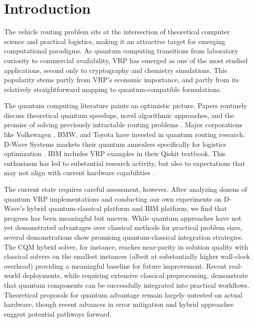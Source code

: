 \documentclass[preprint,3p,12pt,authoryear]{elsarticle}
\begin{document}
\linenumbers

\section{Introduction}

The vehicle routing problem sits at the intersection of theoretical computer science and practical logistics, making it an attractive target for emerging computational paradigms. As quantum computing transitions from laboratory curiosity to commercial availability, VRP has emerged as one of the most studied applications, second only to cryptography and chemistry simulations. This popularity stems partly from VRP's economic importance, and partly from its relatively straightforward mapping to quantum-compatible formulations.

The quantum computing literature paints an optimistic picture. Papers routinely discuss theoretical quantum speedups, novel algorithmic approaches, and the promise of solving previously intractable routing problems \citep{cerezo2021variational, bharti2022noisy}. Major corporations like Volkswagen \citep{neukart2017traffic}, BMW, and Toyota have invested in quantum routing research. D-Wave Systems markets their quantum annealers specifically for logistics optimization \citep{yarkoni2022quantum}. IBM includes VRP examples in their Qiskit textbook. This enthusiasm has led to substantial research activity, but also to expectations that may not align with current hardware capabilities \citep{preskill2018quantum}.


The current state requires careful assessment, however. After analyzing dozens of quantum VRP implementations and conducting our own experiments on D-Wave's hybrid quantum-classical platform and IBM platform, we find that progress has been meaningful but uneven. While quantum approaches have not yet demonstrated advantages over classical methods for practical problem sizes, several demonstrations show promising quantum-classical integration strategies. The CQM hybrid solver, for instance, reaches near-parity in solution quality with classical solvers on the smallest instances (albeit at substantially higher wall-clock overhead) providing a meaningful baseline for future improvement. Recent real-world deployments, while requiring extensive classical preprocessing, demonstrate that quantum components can be successfully integrated into practical workflows. Theoretical proposals for quantum advantage remain largely untested on actual hardware, though recent advances in error mitigation and hybrid approaches suggest potential pathways forward.
\end{document}

